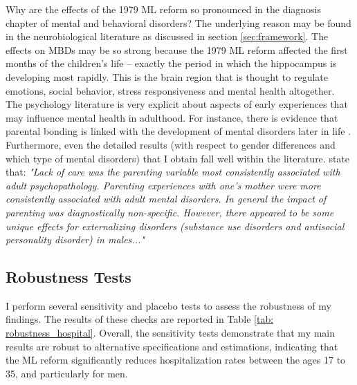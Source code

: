 \documentclass[11pt, a4paper, draft]{article} %
\begin{document}
Why are the effects of the 1979 ML reform so pronounced in the diagnosis chapter of mental and behavioral disorders? The underlying reason may be found in the neurobiological literature as discussed in section \ref{sec:framework}. The effects on MBDs may be so strong because the 1979 ML reform affected the first months of the children's life -- exactly the period in which the hippocampus is developing most rapidly. This is the brain region that is thought to regulate emotions, social behavior, stress responsiveness and mental health altogether. The psychology literature is very explicit about aspects of early experiences that may influence mental health in adulthood. For instance, there is evidence that parental bonding is linked with the development of mental disorders later in life \citep{canetti1997parental}. Furthermore, even the detailed results (with respect to gender differences and which type of mental disorders) that I obtain fall well within the literature. \cite{enns_cox_clara_2002} state that: \textit{"Lack of care was the parenting variable most consistently associated with adult psychopathology. Parenting experiences with one’s mother were more consistently associated with
adult mental disorders. In general the impact of parenting was diagnostically non-specific. However,
there appeared to be some unique effects for externalizing disorders (substance use disorders and
antisocial personality disorder) in males..."}






\bigskip
\subsection{Robustness Tests}\label{sec: robustness}

I perform several sensitivity and placebo tests to assess the robustness of my findings. The results of these checks are reported in Table \ref{tab: robustness_hospital}. Overall, the sensitivity tests demonstrate that my main results are robust to alternative specifications and estimations, indicating that the ML reform significantly reduces hospitalization rates between the ages 17 to 35, and particularly for men.\newline
\end{document}
